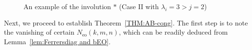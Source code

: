 \documentclass[12pt,reqno]{amsart}
\numberwithin{equation}{section}
\theoremstyle{plain}
\theoremstyle{definition}
\begin{document}
\begin{figure}[htp]
\begin{ferrers}

\end{ferrers}
\caption{An example of the involution $*$ (Case II with $\lambda_i=3>j=2$)}\label{fig:involution}
\end{figure}

Next, we proceed to establish Theorem~\ref{THM:AB-cong}. The first step is to note the vanishing of certain
$N_{\textrm{eo}}(k,m,n)$, which can be readily deduced from Lemma~\ref{lem:Ferrersdiag and bEO}.
\end{document}
